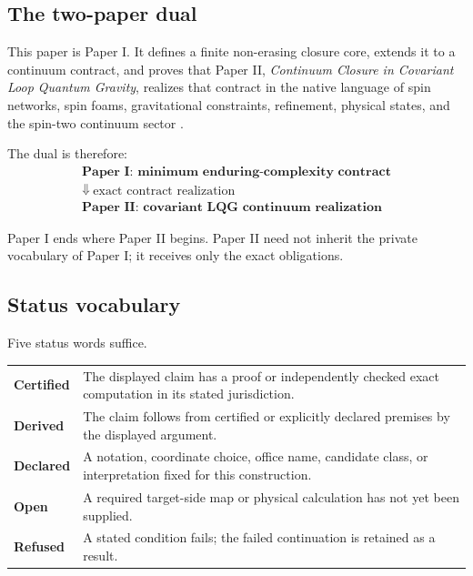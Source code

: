 \documentclass[11pt]{article}
\begin{document}
\subsection{The two-paper dual}

This paper is Paper I. It defines a finite non-erasing closure core, extends it to a continuum contract, and proves that Paper II, \emph{Continuum Closure in Covariant Loop Quantum Gravity}, realizes that contract in the native language of spin networks, spin foams, gravitational constraints, refinement, physical states, and the spin-two continuum sector \cite{CoppaCCLQG2026}.

The dual is therefore:
\[
\boxed{
\begin{array}{c}
\textbf{Paper I: minimum enduring-complexity contract}\\[1mm]
\Downarrow\ \text{exact contract realization}\\[1mm]
\textbf{Paper II: covariant LQG continuum realization}
\end{array}}
\]

Paper I ends where Paper II begins. Paper II need not inherit the private vocabulary of Paper I; it receives only the exact obligations.

\subsection{Status vocabulary}

Five status words suffice.

\begin{center}
\begin{tabularx}{0.95\textwidth}{@{}>{\bfseries}p{}X@{}}
\toprule
Certified & The displayed claim has a proof or independently checked exact computation in its stated jurisdiction.\\
Derived & The claim follows from certified or explicitly declared premises by the displayed argument.\\
Declared & A notation, coordinate choice, office name, candidate class, or interpretation fixed for this construction.\\
Open & A required target-side map or physical calculation has not yet been supplied.\\
Refused & A stated condition fails; the failed continuation is retained as a result.\\
\bottomrule
\end{tabularx}
\end{center}
\end{document}
